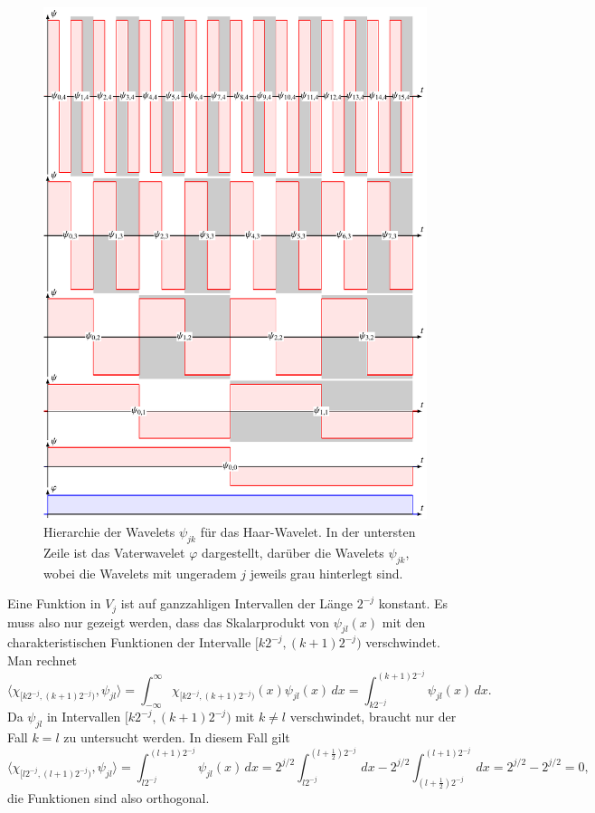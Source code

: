 \begin{figure}
\centering
\includegraphics{chapters/3-haar/images/wavelets.pdf}
\caption{Hierarchie der Wavelets $\psi_{jk}$ für das Haar-Wavelet.
In der untersten Zeile ist das Vaterwavelet $\varphi$ dargestellt,
darüber die Wavelets $\psi_{jk}$, wobei die Wavelets mit ungeradem
$j$ jeweils grau hinterlegt sind.
\label{haar:allwavelets:image}}
\end{figure}

Eine Funktion in $V_j$ ist auf ganzzahligen Intervallen der Länge
$2^{-j}$ konstant.
Es muss also nur gezeigt werden, dass das Skalarprodukt von $\psi_{jl}(x)$
mit den charakteristischen Funktionen der Intervalle $[k2^{-j},(k+1)2^{-j})$
verschwindet.
Man rechnet
\[
\langle \chi_{[k2^{-j},(k+1)2^{-j})},\psi_{jl}\rangle
=
\int_{-\infty}^\infty \chi_{[k2^{-j},(k+1)2^{-j})}(x) \psi_{jl}(x)\,dx
=
\int_{k2^{-j}}^{(k+1)2^{-j}} \psi_{jl}(x)\,dx.
\]
Da $\psi_{jl}$ in Intervallen $[k2^{-j},(k+1)2^{-j})$ mit
$k\ne l$ verschwindet, braucht nur der Fall $k=l$ zu untersucht werden.
In diesem Fall gilt
\[
\langle \chi_{[l2^{-j},(l+1)2^{-j})},\psi_{jl}\rangle
=
\int_{l2^{-j}}^{(l+1)2^{-j}} \psi_{jl}(x)\,dx
=
2^{j/2}
\int_{l2^{-j}}^{(l+\frac12)2^{-j}} \,dx
-
2^{j/2}
\int_{(l+\frac12)2^{-j}}^{(l+1)2^{-j}} \,dx
=
2^{j/2}
-
2^{j/2}
=
0,
\]
die Funktionen sind also orthogonal.


